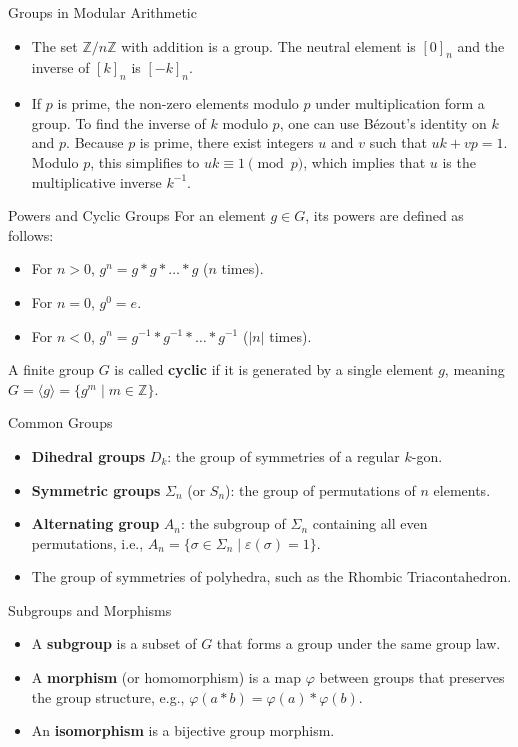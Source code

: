 \documentclass[11pt, a4paper]{article}
\newcommand{\Z}{\mathbb{Z}}
\begin{document}
\begin{example}{Groups in Modular Arithmetic}{}
\begin{itemize}
    \item The set $\Z/n\Z$ with addition is a group. The neutral element is $[0]_n$ and the inverse of $[k]_n$ is $[-k]_n$.
    \item If $p$ is prime, the non-zero elements modulo $p$ under multiplication form a group. To find the inverse of $k$ modulo $p$, one can use Bézout's identity on $k$ and $p$. Because $p$ is prime, there exist integers $u$ and $v$ such that $uk + vp = 1$. Modulo $p$, this simplifies to $uk \equiv 1 \pmod{p}$, which implies that $u$ is the multiplicative inverse $k^{-1}$.
\end{itemize}
\end{example}

\begin{definition}{Powers and Cyclic Groups}{}
For an element $g \in G$, its powers are defined as follows:
\begin{itemize}
    \item For $n > 0$, $g^n = g * g * \dots * g$ ($n$ times).
    \item For $n = 0$, $g^0 = e$.
    \item For $n < 0$, $g^n = g^{-1} * g^{-1} * \dots * g^{-1}$ ($|n|$ times).
\end{itemize}
A finite group $G$ is called \textbf{cyclic} if it is generated by a single element $g$, meaning $G = \langle g \rangle = \{ g^m \mid m \in \Z \}$.
\end{definition}

\begin{example}{Common Groups}{}
\begin{itemize}
    \item \textbf{Dihedral groups} $D_k$: the group of symmetries of a regular $k$-gon.
    \item \textbf{Symmetric groups} $\Sigma_n$ (or $S_n$): the group of permutations of $n$ elements.
    \item \textbf{Alternating group} $A_n$: the subgroup of $\Sigma_n$ containing all even permutations, i.e., $A_n = \{ \sigma \in \Sigma_n \mid \varepsilon(\sigma) = 1 \}$.
    \item The group of symmetries of polyhedra, such as the Rhombic Triacontahedron.
\end{itemize}
\end{example}

\begin{definition}{Subgroups and Morphisms}{}
\begin{itemize}
    \item A \textbf{subgroup} is a subset of $G$ that forms a group under the same group law.
    \item A \textbf{morphism} (or homomorphism) is a map $\varphi$ between groups that preserves the group structure, e.g., $\varphi(a * b) = \varphi(a) * \varphi(b)$.
    \item An \textbf{isomorphism} is a bijective group morphism.
\end{itemize}
\end{definition}
\end{document}
